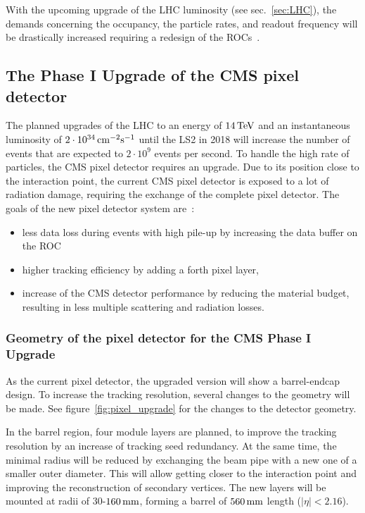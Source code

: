 With the upcoming upgrade of the \ac{LHC} luminosity (see sec.~\ref{sec:LHC}), the demands concerning the occupancy, the particle rates, and readout frequency will be drastically increased requiring a redesign of the \ac{ROC}s~\cite{Dom12}.



\subsection{The Phase I Upgrade of the \ac{CMS} pixel detector}
The planned upgrades of the \ac{LHC} to an energy of $14\,\rm{TeV}$ and an instantaneous luminosity of $2\cdot 10^{34}\,\rm{cm^{-2}s^{-1}}$ until the \acs{LS2} in 2018 will increase the number of events that are expected to $2\cdot 10^{9}$ events per second. To handle the high rate of particles, the \ac{CMS} pixel detector requires an upgrade. Due to its position close to the interaction point, the current \ac{CMS} pixel detector is exposed to a lot of radiation damage, requiring the exchange of the complete pixel detector. The goals of the new pixel detector system are~\cite{Dom12}:
\begin{itemize}
\item less data loss during events with high pile-up by increasing the data buffer on the \ac{ROC}
\item higher tracking efficiency by adding a forth pixel layer,
\item increase of the \ac{CMS} detector performance by reducing the material budget, resulting in less multiple scattering and radiation losses.
\end{itemize}

\subsubsection{Geometry of the pixel detector for the \ac{CMS} Phase I Upgrade}
As the current pixel detector, the upgraded version will show a barrel-endcap design. To increase the tracking resolution, several changes to the geometry will be made. See figure~\ref{fig:pixel_upgrade} for the changes to the detector geometry.

In the barrel region, four module layers are planned, to improve the tracking resolution by an increase of tracking seed redundancy. At the same time, the minimal radius will be reduced by exchanging the beam pipe with a new one of a smaller outer diameter. This will allow getting closer to the interaction point and improving the reconstruction of secondary vertices. The new layers will be mounted at radii of $30$-$160\,\rm{mm}$, forming a barrel of $560\,\rm{mm}$ length ($|\eta |<2.16$).

